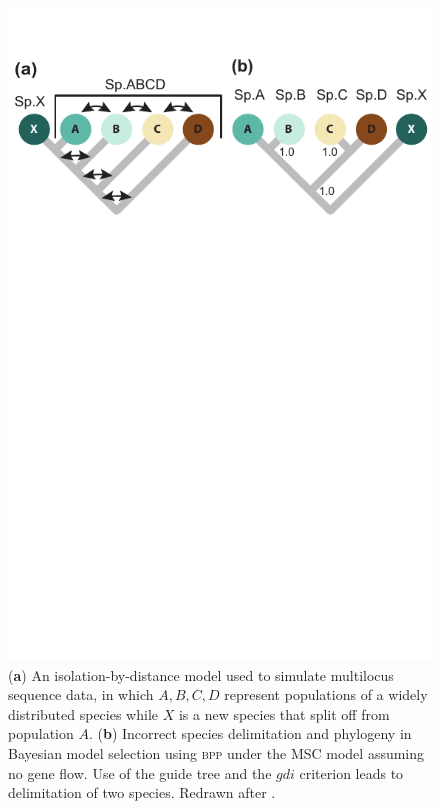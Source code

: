 \documentclass{article1}
\begin{document}
\begin{figure}[t]
   \centering
   \includegraphics[scale=0.7]{figs/fig-ABCDX}
   
   \caption{(\textbf{a}) An isolation-by-distance model used to simulate multilocus
   sequence data, in which $A, B, C, D$ represent populations of a widely distributed
   species while $X$ is a new species that split off from population $A$.  (\textbf{b})
   Incorrect species delimitation and phylogeny in Bayesian model selection using
   \textsc{bpp} under the MSC model assuming no gene flow.  Use of the guide tree and the
   $gdi$ criterion leads to delimitation of two species.  Redrawn after
   \citet[][fig.~5]{Leache2019}. %
} \label{fig:ABCDX}
\end{figure}
\end{document}
